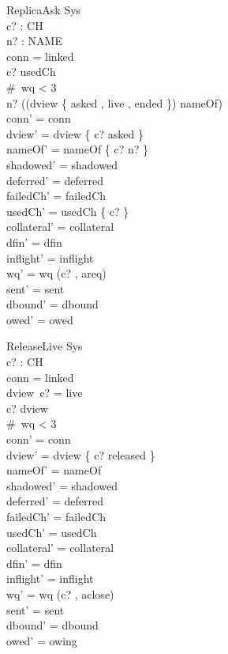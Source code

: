 \documentclass[a4paper,10pt,fleqn]{article}
\begin{document}
\begin{schema}{ReplicaAsk}
  \Delta Sys \\
  c? : CH \\
  n? : NAME \\
\where
  conn = linked \\
  c? \notin usedCh \\
  \#~wq < 3 \\
  n? \notin \ran (\dom (dview \rres \{ asked , live , ended \}) \dres nameOf) \\
  conn' = conn \\
  dview' = dview \oplus \{ c? \mapsto asked \} \\
  nameOf' = nameOf \cup \{ c? \mapsto n? \} \\
  shadowed' = shadowed \\
  deferred' = deferred \\
  failedCh' = failedCh \\
  usedCh' = usedCh \cup \{ c? \} \\
  collateral' = collateral \\
  dfin' = dfin \\
  inflight' = inflight \\
  wq' = wq \cat \langle (c? , areq) \rangle \\
  sent' = sent \\
  dbound' = dbound \\
  owed' = owed
\end{schema}

\begin{schema}{ReleaseLive}
  \Delta Sys \\
  c? : CH \\
\where
  conn = linked \\
  dview~c? = live \\
  c? \in \dom dview \\
  \#~wq < 3 \\
  conn' = conn \\
  dview' = dview \oplus \{ c? \mapsto released \} \\
  nameOf' = nameOf \\
  shadowed' = shadowed \\
  deferred' = deferred \\
  failedCh' = failedCh \\
  usedCh' = usedCh \\
  collateral' = collateral \\
  dfin' = dfin \\
  inflight' = inflight \\
  wq' = wq \cat \langle (c? , aclose) \rangle \\
  sent' = sent \\
  dbound' = dbound \\
  owed' = owing
\end{schema}
\end{document}
